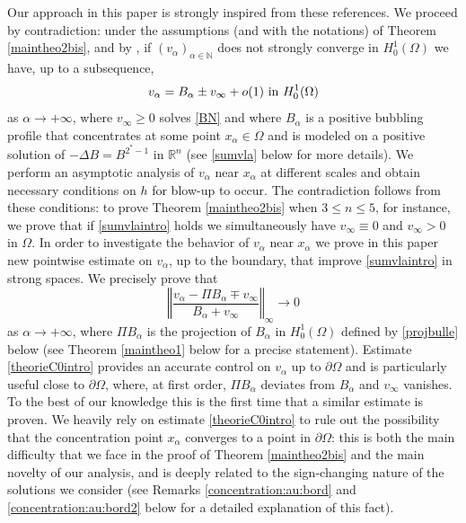 \documentclass[10pt]{amsart}
\numberwithin{equation}{section}
\newcommand{\R}{\mathbb{R}}
\newcommand{\Om}{\Omega}
\def \bb{\hbox}
\def \xl{x_\alpha}
\def \va{v_{\alpha}}
\def \vo {v_{\infty}}
\theoremstyle{plain}
\theoremstyle{remark}
\begin{document}
Our approach in this paper is strongly inspired from these references. We proceed by contradiction: under the assumptions (and with the notations) of Theorem \ref{maintheo2bis}, and by \cite{Struwe}, if $(v_\alpha)_{\alpha \in \mathbb{N}}$ does not strongly converge in $H^1_0(\Om)$ we have, up to a subsequence,
\begin{equation} \label{sumvlaintro}
	\va=B_{\alpha} \pm \vo+ o(1)  \bb{ in } H_0^1(\Om)
\end{equation}
as $\alpha \to +\infty$, where $\vo  \ge 0 $ solves \eqref{BN} and where $B_\alpha$ is a positive bubbling profile that concentrates at some point $x_\alpha \in \Om$ and is modeled on a positive solution of $-\Delta B = B^{2^*-1}$ in $\R^n$ (see \eqref{sumvla} below for more details). We perform an asymptotic analysis of $\va$ near $x_\alpha$ at different scales and obtain necessary conditions on $h$ for blow-up to occur. The contradiction follows from these conditions: to prove Theorem \ref{maintheo2bis} when $3 \le n \le 5$, for instance, we prove that if \eqref{sumvlaintro} holds we simultaneously have  $\vo \equiv 0$ and $\vo >0$ in $\Om$.  In order to investigate the behavior of $\va$ near $x_\alpha$ we prove in this paper new pointwise estimate on $\va$, up to the boundary, that improve \eqref{sumvlaintro} in strong spaces. We precisely prove that 
\begin{equation} \label{theorieC0intro}
 \left \Vert \frac{\va - \Pi B_\alpha \mp \vo}{B_\alpha + \vo} \right \Vert_{\infty} \to 0 
\end{equation}
as $\alpha \to + \infty$, where $\Pi B_\alpha$ is the projection of $B_\alpha$ in $H^1_0(\Om)$ defined by \eqref{projbulle} below (see Theorem \ref{maintheo1} below for a precise statement). Estimate \eqref{theorieC0intro} provides an accurate control on $\va$ up to $\partial \Om$ and is particularly useful close to $\partial \Om$, where, at first order,  $\Pi B_\alpha $ deviates from $B_\alpha$  and $v_\infty$ vanishes. To the best of our knowledge this is the first time that a similar estimate is proven. We heavily rely on estimate \eqref{theorieC0intro} to rule out the possibility that the concentration point $\xl$ converges to a point in $\partial \Om$: this is both the main difficulty that we face in the proof of Theorem  \ref{maintheo2bis} and the main novelty of our analysis, and is deeply related to the sign-changing nature of the solutions we consider (see Remarks \ref{concentration:au:bord} and \ref{concentration:au:bord2} below for a detailed explanation of this fact). 
\end{document}
